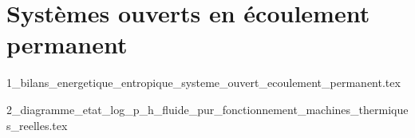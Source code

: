 \chapter[Systèmes ouverts]{Systèmes ouverts en écoulement permanent}

\minitoc 

{1_bilans_energetique_entropique_systeme_ouvert_ecoulement_permanent.tex}

{2_diagramme_etat_log_p_h_fluide_pur_fonctionnement_machines_thermiques_reelles.tex}


